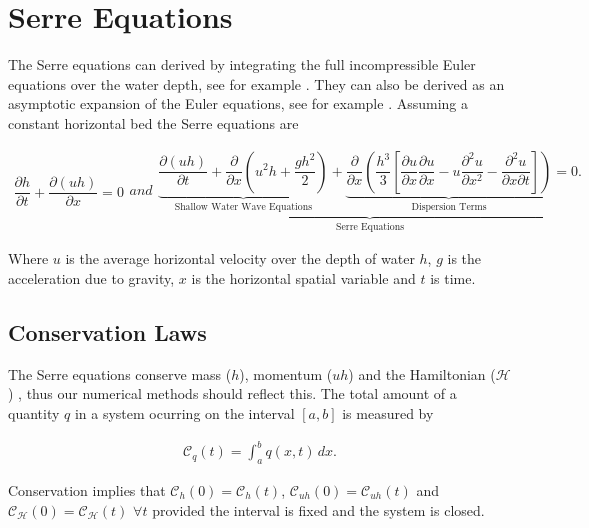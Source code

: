 \documentclass[SingleSpace,12pt,Proceedings]{Serre_ASCE}
\begin{document}
\section{Serre Equations}
\label{section:Serre Equations}
The Serre equations can derived by integrating the full incompressible Euler equations over the water depth, see for example . They can also be derived as an asymptotic expansion of the Euler equations, see for example . Assuming a constant horizontal bed the Serre equations are \cite{Guyenne-etal-2014-169}
\begin{linenomath*}
\begin{subequations}\label{eq:Serre_nonconservative_form}
\begin{gather}
\dfrac{\partial h}{\partial t} + \dfrac{\partial (uh)}{\partial x} = 0
\label{eq:Serre_continuity}
\end{gather}
and
\begin{gather}
\underbrace{\underbrace{\dfrac{\partial (uh)}{\partial t} + \dfrac{\partial}{\partial x} \left ( u^2h + \dfrac{gh^2}{2}\right )}_{\text{Shallow Water Wave Equations}} + \underbrace{\dfrac{\partial}{\partial x} \left (  \dfrac{h^3}{3} \left [ \dfrac{\partial u }{\partial x} \dfrac{\partial u}{\partial x} - u\dfrac{\partial^2 u}{\partial x^2}  - \dfrac{\partial^2 u}{\partial x \partial t}\right ] \right )}_{\text{Dispersion Terms}} = 0.}_{\text{Serre Equations}}
\label{eq:Serre_momentum}
\end{gather}
\end{subequations}
\end{linenomath*}
Where $u$ is the average horizontal velocity over the depth of water $h$, $g$ is the acceleration due to gravity, $x$ is the horizontal spatial variable and $t$ is time. 

\subsection{Conservation Laws}
The Serre equations conserve mass  ($h$), momentum ($uh$)  and the Hamiltonian ($\mathcal{H}$) \cite{Li-Y-2002,Green-Naghdi-1976-237}, thus our numerical methods should reflect this. The total amount of a quantity $q$ in a system ocurring on the interval $[a,b]$ is measured by
\begin{linenomath*}
\begin{gather*}
\label{eqn:Condef}
\mathcal{C}_q(t) = \int_{a}^{b} q(x,t)\, dx .
\end{gather*}
\end{linenomath*}
Conservation implies that $\mathcal{C}_{h}(0) = \mathcal{C}_{h}(t)$, $\mathcal{C}_{uh}(0) = \mathcal{C}_{uh}(t)$ and $\mathcal{C}_{\mathcal{H}}(0) = \mathcal{C}_{\mathcal{H}}(t)$ $\forall t$ provided the interval is fixed and the system is closed.
\end{document}
